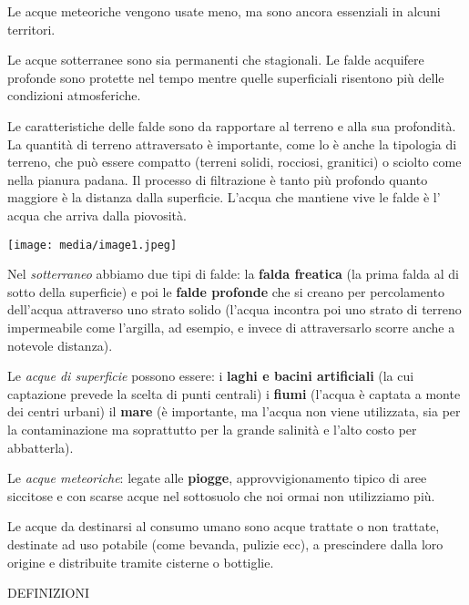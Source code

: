 \documentclass[]{article}
\begin{document}
Le acque meteoriche vengono usate meno, ma sono ancora essenziali in
alcuni territori.

Le acque sotterranee sono sia permanenti che stagionali. Le falde
acquifere profonde sono protette nel tempo mentre quelle superficiali
risentono più delle condizioni atmosferiche.

Le caratteristiche delle falde sono da rapportare al terreno e alla sua
profondità. La quantità di terreno attraversato è importante, come lo è
anche la tipologia di terreno, che può essere compatto (terreni solidi,
rocciosi, granitici) o sciolto come nella pianura padana. Il processo di
filtrazione è tanto più profondo quanto maggiore è la distanza dalla
superficie. L'acqua che mantiene vive le falde è l' acqua che arriva
dalla piovosità.

\texttt{[image: media/image1.jpeg]}

Nel \emph{sotterraneo} abbiamo due tipi di falde: la \textbf{falda
freatica} (la prima falda al di sotto della superficie) e poi le
\textbf{falde profonde} che si creano per percolamento dell'acqua
attraverso uno strato solido (l'acqua incontra poi uno strato di terreno
impermeabile come l'argilla, ad esempio, e invece di attraversarlo
scorre anche a notevole distanza).

Le \emph{acque di superficie} possono essere: i \textbf{laghi e bacini
artificiali} (la cui captazione prevede la scelta di punti centrali) i
\textbf{fiumi} (l'acqua è captata a monte dei centri urbani) il
\textbf{mare} (è importante, ma l'acqua non viene utilizzata, sia per la
contaminazione ma soprattutto per la grande salinità e l'alto costo per
abbatterla).

Le \emph{acque meteoriche}: legate alle \textbf{piogge},
approvvigionamento tipico di aree siccitose e con scarse acque nel
sottosuolo che noi ormai non utilizziamo più.

Le acque da destinarsi al consumo umano sono acque trattate o non
trattate, destinate ad uso potabile (come bevanda, pulizie ecc), a
prescindere dalla loro origine e distribuite tramite cisterne o
bottiglie.

DEFINIZIONI
\end{document}
